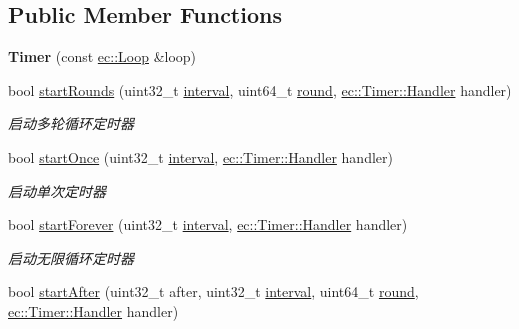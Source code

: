 \subsection*{Public Member Functions}
\begin{DoxyCompactItemize}
\item 
\hypertarget{classec_1_1Timer_a85cc8b047f79f6017b865e3921eb0e95}{{\bfseries Timer} (const \hyperlink{classec_1_1Loop}{ec\-::\-Loop} \&loop)}\label{classec_1_1Timer_a85cc8b047f79f6017b865e3921eb0e95}

\item 
bool \hyperlink{classec_1_1Timer_ad48f591873f207f843a3fc8b306063bf}{start\-Rounds} (uint32\-\_\-t \hyperlink{classec_1_1Timer_af632191a18c3b476fe052404643046c6}{interval}, uint64\-\_\-t \hyperlink{classec_1_1Timer_ae576336f9adac852fcf1172e0c740960}{round}, \hyperlink{classec_1_1Timer_acbf2889a6472ca60ce4d3c8856b717c5}{ec\-::\-Timer\-::\-Handler} handler)
\begin{DoxyCompactList}\small\item\em 启动多轮循环定时器 \end{DoxyCompactList}\item 
bool \hyperlink{classec_1_1Timer_af066807719d25dd78919346b1bc28d17}{start\-Once} (uint32\-\_\-t \hyperlink{classec_1_1Timer_af632191a18c3b476fe052404643046c6}{interval}, \hyperlink{classec_1_1Timer_acbf2889a6472ca60ce4d3c8856b717c5}{ec\-::\-Timer\-::\-Handler} handler)
\begin{DoxyCompactList}\small\item\em 启动单次定时器 \end{DoxyCompactList}\item 
bool \hyperlink{classec_1_1Timer_ac103f227ad5f5bd44a29c24e37aabc20}{start\-Forever} (uint32\-\_\-t \hyperlink{classec_1_1Timer_af632191a18c3b476fe052404643046c6}{interval}, \hyperlink{classec_1_1Timer_acbf2889a6472ca60ce4d3c8856b717c5}{ec\-::\-Timer\-::\-Handler} handler)
\begin{DoxyCompactList}\small\item\em 启动无限循环定时器 \end{DoxyCompactList}\item 
bool \hyperlink{classec_1_1Timer_a3bbcca634bad30417438a085abe31d25}{start\-After} (uint32\-\_\-t after, uint32\-\_\-t \hyperlink{classec_1_1Timer_af632191a18c3b476fe052404643046c6}{interval}, uint64\-\_\-t \hyperlink{classec_1_1Timer_ae576336f9adac852fcf1172e0c740960}{round}, \hyperlink{classec_1_1Timer_acbf2889a6472ca60ce4d3c8856b717c5}{ec\-::\-Timer\-::\-Handler} handler)

\end{DoxyCompactItemize}
